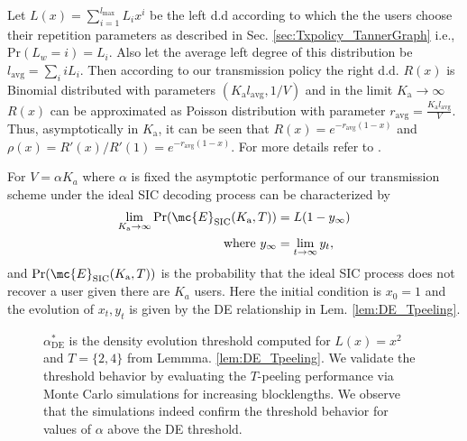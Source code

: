 \documentclass[final,onecolumn,12pt]{IEEEtran}
\def\Ka{K_{\text{a}}}
\def\Pr{\mathrm{Pr}}
\begin{document}
Let $L(x)=\sum_{i=1}^{l_{\max}} L_i x^i$ be the left d.d according to which the the users choose their repetition parameters as described in Sec. \ref{sec:Txpolicy_TannerGraph} i.e., $\Pr(L_{w}=i)=L_i$. Also let the average left degree of this distribution be $l_{\text{avg}}=\sum_i iL_i$. Then according to our transmission policy the right d.d. $R(x)$ is Binomial distributed with parameters $(\Ka l_{\text{avg}},1/V)$  and in the limit $\Ka\rightarrow \infty$ $R(x)$ can be approximated as Poisson distribution with parameter $r_{\text{avg}}=\frac{\Ka l_{\text{avg}}}{V}$. Thus, asymptotically in $\Ka$, it can be seen that $R(x)=e^{-r_{\text{avg}}(1-x)}$ and $\rho(x)=R'(x)/R'(1)=e^{-r_{\text{avg}}(1-x)}$. For more details refer to \cite{narayanan2012iterative}.

\begin{lemma} For $V=\alpha K_a$ where $\alpha$ is fixed the asymptotic performance of our transmission scheme under the ideal SIC decoding process can be characterized by %
\begin{align*}
\lim_{\Ka\rightarrow \infty} \Pr(\mc{E}_{\text{SIC}}(\Ka,T))&=L(1-y_{\infty})\notag\\
\text{ where } y_{\infty} &=\lim_{t\rightarrow\infty} y_t,
\end{align*}
and $\Pr(\mc{E}_{\text{SIC}}(\Ka,T))$ is the probability that the ideal SIC process does not recover a user given there  are $K_a$ users. Here the initial condition is $x_0=1$ and the evolution of $x_t,y_t$ is given by the DE relationship in Lem. \ref{lem:DE_Tpeeling}.
\label{lem:asymptotic_SIC}
\end{lemma}

\begin{figure}[h!]
  \centering
  \resizebox{0.6\textwidth}{!}{}
  \caption{$\alpha^*_{\text{DE}}$ is the density evolution threshold computed for $L(x)=x^2$ and $T=\{2,4\}$ from Lemmma. \eqref{lem:DE_Tpeeling}. We validate the threshold behavior by evaluating the $T$-peeling performance via Monte Carlo simulations for increasing blocklengths. We observe that the simulations indeed confirm the threshold behavior for values of $\alpha$ above the DE threshold.}
  \label{fig:DEvBP}
\end{figure}
\end{document}
